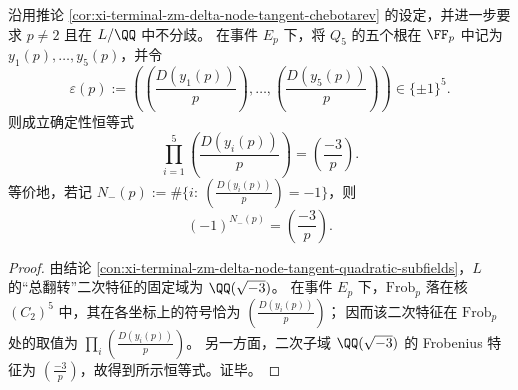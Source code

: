 \begin{corollary}[完全分裂素数处的奇偶律]\label{cor:xi-terminal-zm-delta-node-tangent-parity-law}
沿用推论 \ref{cor:xi-terminal-zm-delta-node-tangent-chebotarev} 的设定，并进一步要求 \(p\neq 2\) 且在 \(L/\QQ\) 中不分歧。
在事件 \(E_p\) 下，将 \(Q_5\) 的五个根在 \(\FF_p\) 中记为 \(y_1(p),\dots,y_5(p)\)，并令
\[
\varepsilon(p):=\left(\left(\frac{D(y_1(p))}{p}\right),\dots,\left(\frac{D(y_5(p))}{p}\right)\right)\in\{\pm 1\}^5.
\]
则成立确定性恒等式
\[
\prod_{i=1}^{5}\left(\frac{D(y_i(p))}{p}\right)=\left(\frac{-3}{p}\right).
\]
等价地，若记 \(N_-(p):=\#\{i:\ (\tfrac{D(y_i(p))}{p})=-1\}\)，则
\[
(-1)^{N_-(p)}=\left(\frac{-3}{p}\right).
\]
\end{corollary}
\begin{proof}
由结论 \ref{con:xi-terminal-zm-delta-node-tangent-quadratic-subfields}，\(L\) 的“总翻转”二次特征的固定域为 \(\QQ(\sqrt{-3})\)。
在事件 \(E_p\) 下，\(\mathrm{Frob}_p\) 落在核 \((C_2)^5\) 中，其在各坐标上的符号恰为 \((\tfrac{D(y_i(p))}{p})\)；
因而该二次特征在 \(\mathrm{Frob}_p\) 处的取值为 \(\prod_i(\tfrac{D(y_i(p))}{p})\)。
另一方面，二次子域 \(\QQ(\sqrt{-3})\) 的 Frobenius 特征为 \((\tfrac{-3}{p})\)，故得到所示恒等式。证毕。
\end{proof}


\endinput
